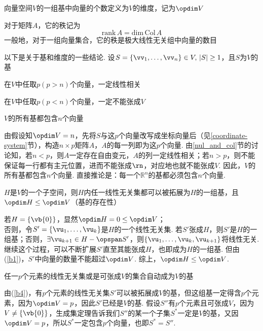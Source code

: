 \begin{definition}[维度]
向量空间$V$的一组基中向量的个数定义为$V$的维度，记为$\opdim V$
\end{definition}
\begin{definition}[秩]
对于矩阵$A$，它的秩记为
\[\mathrm{rank}\,A=\mathrm{dim}\,\mathrm{Col}\,A\]
一般地，对于一组向量集合，它的秩是极大线性无关组中向量的数目
\end{definition}
\begin{theorem}以下是关于基和维度的一些结论. 设$S=\{\vv_1,\dots,\vv_n\}\in V,\,|S|\geq 1$，且$S$为$V$的基
\label{basis_theo}
\begin{partlist}
	\item \label{b1}在$V$中任取$p(p>n)$个向量，一定线性相关 %
	\item 在$V$中任取$p(p<n)$个向量，一定不能张成$V$%
	\item $V$的所有基都包含$n$个向量
	\begin{analysis}
	由假设知$\opdim V=n$，先将$S$与这$p$个向量改写成坐标向量后（见\ref{coordinate-system}节），构造$n\times p$矩阵$A$，$A$的每一列即为这$p$个向量. 由\ref{nul_and_col}节的讨论知，若$n<p$，则$A$一定存在自由变元，$A$的列一定线性相关；若$n>p$，则不能保证每一行都有主元位置，进而不能张成$\rn$，对应地也就不能张成$V$. 因此，$V$的所有基都包含$n$个向量.
	直接推论是：每一个$\mathbb{R}^n$的基都必须包含$n$个向量.
	\end{analysis}
	\item \label{b4}$H$是$V$的一个子空间，则$H$内任一线性无关集都可以被拓展为$H$的一组基，且$\opdim H\leq\opdim V$（基的存在性）
	\begin{analysis}
	若$H=\{\vb{0}\}$，显然$\opdim H=0\leq\opdim V$；\\
	否则，令$S'=\{\vu_1,\dots,\vu_k\}$是$H$的一个线性无关集. 若$S'$张成$H$，则$S'$是$H$的一组基；否则，$\exists\vu_{k+1}\in H-\opspan S'$，则$\{\vu_1,\dots,\vu_k,\vu_{k+1}\}$将线性无关. 继续这个过程，可以不断扩展$S'$直至其能张成$H$，也即成为$H$的一组基. 但由(\ref{b1})，$S'$中向量的数量不能超过$\opdim V$. 综上，$\opdim H\leq\opdim V$.
	\end{analysis}
	\item \label{b5}任一$p$个元素的线性无关集或是可张成$V$的集合自动成为$V$的基
	\begin{analysis}
	由(\ref{b4})，有$p$个元素的线性无关集$S'$可以被拓展成$V$的基，但这组基一定得含$p$个元素，因为$\opdim V=p$，因此$S'$已经是$V$的基. 假设$S''$有$p$个元素且可张成$V$，因为$V\ne\{\vb{0}\}$，生成集定理告诉我们$S''$的某一个子集$S^*$一定是$V$的基，又因$\opdim V=p$，所以$S^*$一定包含$p$个向量，也即$S^*=S''$.

\end{analysis}
\end{partlist}
\end{theorem}
